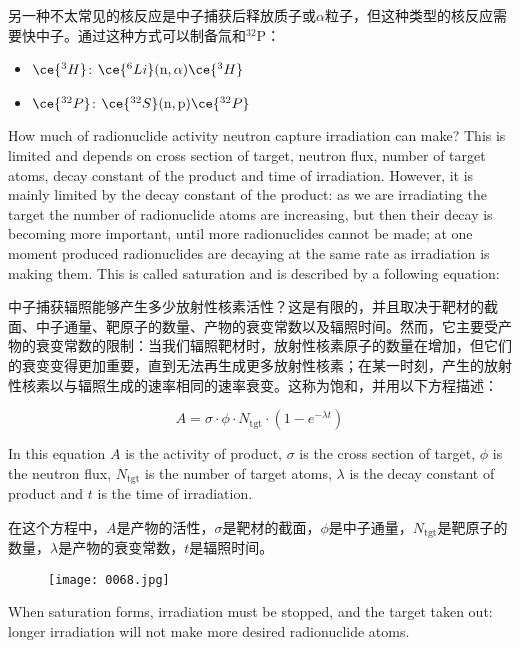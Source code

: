 \documentclass[dvipsnames, svgnames,a4paper,11pt]{article}
\begin{document}
另一种不太常见的核反应是中子捕获后释放质子或$\alpha$粒子，但这种类型的核反应需要快中子。通过这种方式可以制备氚和${}^\text{32}\text{P}$：

\begin{itemize}
    \item \(\ce{^{3}H}\): \(\ce{^{6}Li} (\text{n}, \alpha) \ce{^{3}H}\)
    
    \item \(\ce{^{32}P}\): \(\ce{^{32}S} (\text{n}, \text{p}) \ce{^{32}P}\)
  \end{itemize}
  

How much of radionuclide activity neutron capture irradiation can make? This is limited and depends on cross section of target, neutron flux, number of target atoms, decay constant of the product and time of irradiation. However, it is mainly limited by the decay constant of the product: as we are irradiating the target the number of radionuclide atoms are increasing, but then their decay is becoming more important, until more radionuclides cannot be made; at one moment produced radionuclides are decaying at the same rate as irradiation is making them. This is called saturation and is described by a following equation:

中子捕获辐照能够产生多少放射性核素活性？这是有限的，并且取决于靶材的截面、中子通量、靶原子的数量、产物的衰变常数以及辐照时间。然而，它主要受产物的衰变常数的限制：当我们辐照靶材时，放射性核素原子的数量在增加，但它们的衰变变得更加重要，直到无法再生成更多放射性核素；在某一时刻，产生的放射性核素以与辐照生成的速率相同的速率衰变。这称为饱和，并用以下方程描述：


$$A = \sigma \cdot \phi \cdot N_{\text{tgt}} \cdot (1 - e^{-\lambda t})
$$

In this equation $A$ is the activity of product, $\sigma$ is the cross section of target, $\phi$ is the neutron flux, $N_{\text{tgt}}$ is the number of target atoms, $\lambda$ is the decay constant of product and $t$ is the time of irradiation.

在这个方程中，$A$是产物的活性，$\sigma$是靶材的截面，$\phi$是中子通量，$N_{\text{tgt}}$是靶原子的数量，$\lambda$是产物的衰变常数，$t$是辐照时间。

\begin{figure}[ht]
    \centering
    \texttt{[image: 0068.jpg]}
     \label{fig58}
\end{figure}


When saturation forms, irradiation must be stopped, and the target taken out: longer irradiation will not make more desired radionuclide atoms.
\end{document}
